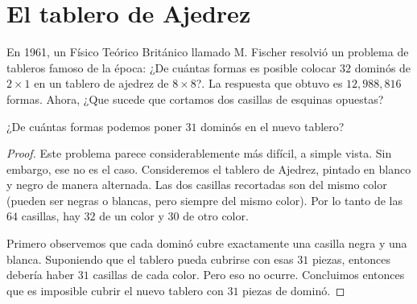 \section{El tablero de Ajedrez}

En 1961, un F\'isico Te\'orico Brit\'anico llamado M. Fischer resolvi\'o un problema de tableros famoso de la \'epoca: ¿De cu\'antas formas es posible colocar $32$ domin\'os de $2\times 1$ en un tablero de ajedrez de $8\times 8$?. La respuesta que obtuvo es $12,988,816$ formas. 
Ahora, ¿Que sucede que cortamos dos casillas de esquinas opuestas?

\begin{ejem} \label{primerejemplo}
	 ¿De cu\'antas formas podemos poner $31$ domin\'os en el nuevo tablero?
\end{ejem}
\begin{proof}
	Este problema parece considerablemente m\'as dif\'icil, a simple vista. Sin embargo, ese no es el caso. Consideremos el tablero de Ajedrez, pintado en blanco y negro de manera alternada. Las dos casillas recortadas son del mismo color (pueden ser negras o blancas, pero siempre del mismo color). Por lo tanto de las $64$ casillas, hay $32$ de un color y $30$ de otro color. 
	
	Primero observemos que cada domin\'o cubre exactamente una casilla negra y una blanca. Suponiendo que el tablero pueda cubrirse con esas $31$ piezas, entonces deber\'ia haber $31$ casillas de cada color. Pero eso no ocurre. Concluimos entonces que es imposible cubrir el nuevo tablero con $31$ piezas de domin\'o. 
\end{proof}
 

